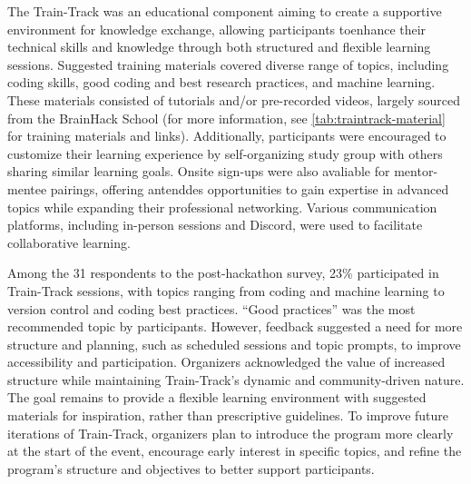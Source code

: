 \documentclass{article}
\begin{document}
The Train-Track was an educational component aiming to create a supportive environment for knowledge exchange, allowing participants toenhance their technical skills and knowledge through both structured and flexible learning sessions. Suggested training materials covered diverse range of topics, including coding skills, good coding and best research practices, and machine learning. These materials consisted of tutorials and/or pre-recorded videos, largely sourced from the BrainHack School (for more information, see \ref{tab:traintrack-material} for training materials and links). Additionally, participants were encouraged to customize their learning experience  by self-organizing  study group with others sharing similar learning goals. Onsite sign-ups were also avaliable for mentor-mentee pairings, offering antenddes opportunities to gain expertise in advanced topics while expanding their professional networking. Various communication platforms, including in-person sessions and Discord, were used to facilitate collaborative learning.

Among the 31 respondents to the post-hackathon survey, 23\% participated in Train-Track sessions, with topics ranging from coding and machine learning to version control and coding best practices. “Good practices” was the most recommended topic by participants. However, feedback suggested a need for more structure and planning, such as scheduled sessions and topic prompts, to improve accessibility and participation. Organizers acknowledged the value of increased structure while maintaining Train-Track’s dynamic and community-driven nature. The goal remains to provide a flexible learning environment with suggested materials for inspiration, rather than prescriptive guidelines. To improve future iterations of Train-Track, organizers plan to introduce the program more clearly at the start of the event, encourage early interest in specific topics, and refine the program’s structure and objectives to better support participants.
\end{document}
